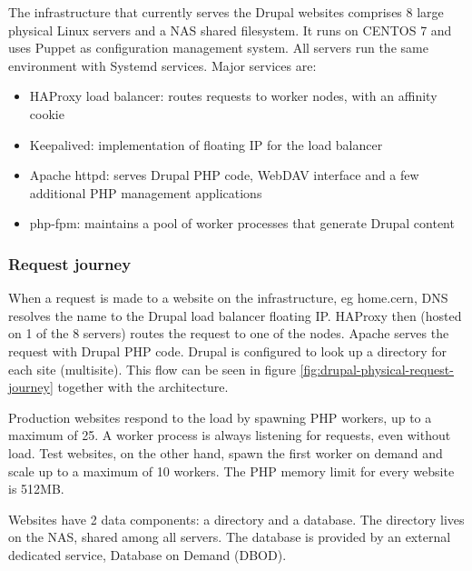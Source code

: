 The infrastructure that currently serves the Drupal websites comprises 8 large physical Linux servers and a NAS shared filesystem.
It runs on CENTOS 7 and uses Puppet as configuration management system.
All servers run the same environment with Systemd services.
Major services are:
\begin{itemize}
    \item HAProxy load balancer: routes requests to worker nodes, with an affinity cookie
    \item Keepalived: implementation of floating IP for the load balancer
    \item Apache httpd: serves Drupal PHP code, WebDAV interface and a few additional PHP management applications
    \item php-fpm: maintains a pool of worker processes that generate Drupal content
\end{itemize}

\subsubsection*{Request journey}

When a request is made to a website on the infrastructure, eg home.cern, DNS resolves the name to the Drupal load balancer floating IP.
HAProxy then (hosted on 1 of the 8 servers) routes the request to one of the nodes.
Apache serves the request with Drupal PHP code. Drupal is configured to look up a directory for each site (multisite).
This flow can be seen in figure \ref{fig:drupal-physical-request-journey} together with the architecture.

Production websites respond to the load by spawning PHP workers, up to a maximum of 25.
A worker process is always listening for requests, even without load.
Test websites, on the other hand, spawn the first worker on demand and scale up to a maximum of 10 workers.
The PHP memory limit for every website is 512MB.

Websites have 2 data components: a directory and a database.
The directory lives on the NAS, shared among all servers.
The database is provided by an external dedicated service, Database on Demand (DBOD).

